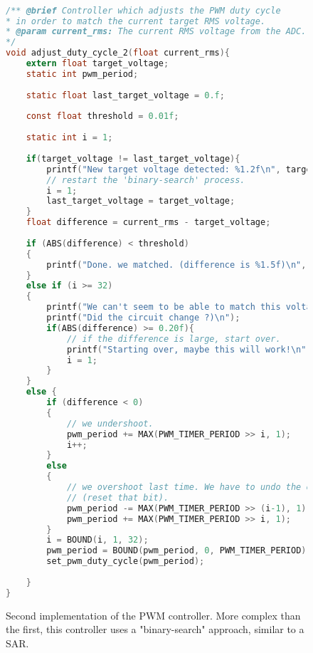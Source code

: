 \begin{figure}[h]
\begin{lstlisting}[language=C, basicstyle=\small, tabsize=2, showstringspaces=false]

/** @brief Controller which adjusts the PWM duty cycle
* in order to match the current target RMS voltage.
* @param current_rms: The current RMS voltage from the ADC.
*/
void adjust_duty_cycle_2(float current_rms){
	extern float target_voltage;
	static int pwm_period;
	
	static float last_target_voltage = 0.f;
		
	const float threshold = 0.01f;
	
	static int i = 1;	
	
	if(target_voltage != last_target_voltage){
		printf("New target voltage detected: %1.2f\n", target_voltage);
		// restart the 'binary-search' process.
		i = 1;
		last_target_voltage = target_voltage;
	}
	float difference = current_rms - target_voltage;
	
	if (ABS(difference) < threshold)
	{
		printf("Done. we matched. (difference is %1.5f)\n", difference);
	}
	else if (i >= 32)
	{
		printf("We can't seem to be able to match this voltage! (%1.2f)\n", target_voltage);
		printf("Did the circuit change ?)\n"); 
		if(ABS(difference) >= 0.20f){
			// if the difference is large, start over.
			printf("Starting over, maybe this will work!\n");
			i = 1;
		}
	}
	else {
		if (difference < 0)
		{
			// we undershoot.
			pwm_period += MAX(PWM_TIMER_PERIOD >> i, 1);
			i++;
		}
		else
		{
			// we overshoot last time. We have to undo the change we did last time
			// (reset that bit). 
			pwm_period -= MAX(PWM_TIMER_PERIOD >> (i-1), 1);
			pwm_period += MAX(PWM_TIMER_PERIOD >> i, 1);
		}
		i = BOUND(i, 1, 32);
		pwm_period = BOUND(pwm_period, 0, PWM_TIMER_PERIOD);
		set_pwm_duty_cycle(pwm_period);
	
	}
}
\end{lstlisting}
\caption{\label{fig:pwm_controller_2_logic} Second implementation of the PWM controller. More complex than the first, this controller uses a "binary-search" approach, similar to a SAR.}
\end{figure}